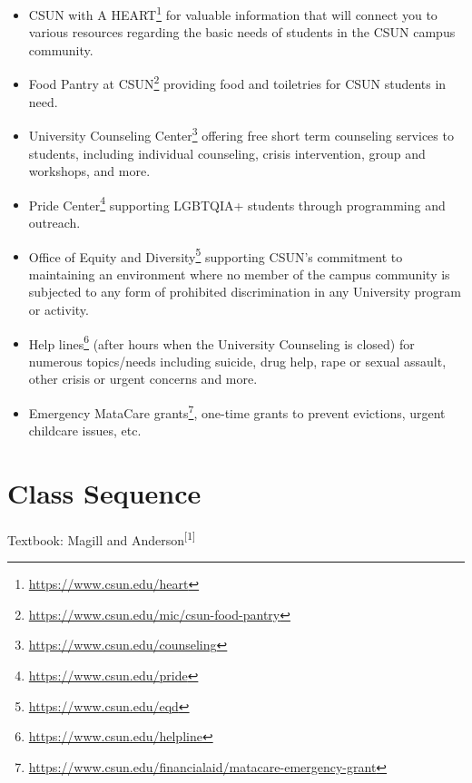 \documentclass[
  letterpaper,
  DIV=11,
  numbers=noendperiod,
  oneside]{scrartcl}
\DeclareRobustCommand{\href}[2]{#2\footnote{\url{#1}}}
\begin{document}
\begin{itemize}
\item
  \href{https://www.csun.edu/heart}{CSUN with A HEART} for valuable
  information that will connect you to various resources regarding the
  basic needs of students in the CSUN campus community.
\item
  \href{https://www.csun.edu/mic/csun-food-pantry}{Food Pantry at CSUN}
  providing food and toiletries for CSUN students in need.
\item
  \href{https://www.csun.edu/counseling}{University Counseling Center}
  offering free short term counseling services to students, including
  individual counseling, crisis intervention, group and workshops, and
  more.
\item
  \href{https://www.csun.edu/pride}{Pride Center} supporting LGBTQIA+
  students through programming and outreach.
\item
  \href{https://www.csun.edu/eqd}{Office of Equity and Diversity}
  supporting CSUN's commitment to maintaining an environment where no
  member of the campus community is subjected to any form of prohibited
  discrimination in any University program or activity.
\item
  \href{https://www.csun.edu/helpline}{Help lines} (after hours when the
  University Counseling is closed) for numerous topics/needs including
  suicide, drug help, rape or sexual assault, other crisis or urgent
  concerns and more.
\item
  \href{https://www.csun.edu/financialaid/matacare-emergency-grant}{Emergency
  MataCare grants}, one-time grants to prevent evictions, urgent
  childcare issues, etc.
\end{itemize}

\hypertarget{class-sequence}{%
\section{Class Sequence}\label{class-sequence}}

Textbook: Magill and Anderson\textsuperscript{{[}1{]}}
\end{document}
